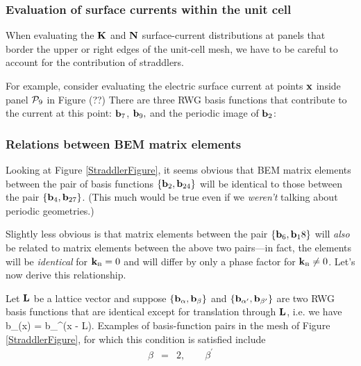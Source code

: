 \subsubsection{Evaluation of surface currents within the unit cell}

When evaluating the $\mathbf{K}$ and $\mathbf{N}$ surface-current 
distributions at panels that border the upper or right edges 
of the unit-cell mesh, we have to be careful to account for the 
contribution of straddlers. 

For example, consider evaluating the electric surface current at 
points $\mathbf{x}$ inside panel $\mathcal{P}_9$ in Figure (??) %
There are three RWG basis functions that contribute to the current
at this point: $\mathbf{b}_7$, $\mathbf{b}_9,$ and the periodic image of 
$\mathbf{b}_2$:

\subsubsection{Relations between BEM matrix elements}

Looking at Figure \ref{StraddlerFigure}, it seems 
obvious that BEM matrix elements between the pair of 
basis functions
$\{\mathbf{b}_2, \mathbf{b}_{24}\}$ will be identical to those
between the pair 
$\{\mathbf{b}_4, \mathbf{b}_{27}\}$. (This much would be 
true even if we \textit{weren't} talking about
periodic geometries.)

Slightly less obvious is that matrix elements between
the pair $\{\mathbf{b}_6, \mathbf{b}_18\}$ will \textit{also}
be related to matrix elements between the above two
pairs---in fact, the elements will be \textit{identical}
for $\mathbf{k}_{\hbox{\tiny{B}}}=0$ and will differ by only a phase factor
for $\mathbf{k}_{\hbox{\tiny{B}}}\ne 0$. Let's now derive this relationship.

Let $\mathbf{L}$ be a lattice vector and suppose
$\{\mathbf{b}_\alpha, \mathbf{b}_\beta\}$ and
$\{\mathbf{b}_{\alpha^\prime}, \mathbf{b}_{\beta^\prime}\}$
are two RWG basis functions that are identical except 
for translation through $\mathbf{L}$, i.e. we have
 { \vb b_\beta(\vb x) = \vb b_\beta^\prime(\vb x - \vb L).
 }
Examples of basis-function pairs in the mesh of Figure 
\ref{StraddlerFigure}, for which this condition is satisfied 
include
$$\begin{array}{lclclcl}
  \beta&=&2, \qquad \beta^\prime
  \end{array}
$$

\begin{align*}
\end{align*}
